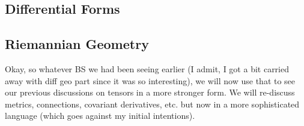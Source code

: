 \subsection{Differential Forms}
\subsection{Riemannian Geometry}
Okay, so whatever BS we had been seeing earlier (I admit, I got a bit carried away with diff geo part since it was so interesting), we will now use that to see our previous discussions on tensors in a more stronger form. We will re-discuss metrics, connections, covariant derivatives, etc. but now in a more sophisticated language (which goes against my initial intentions). 

% 

